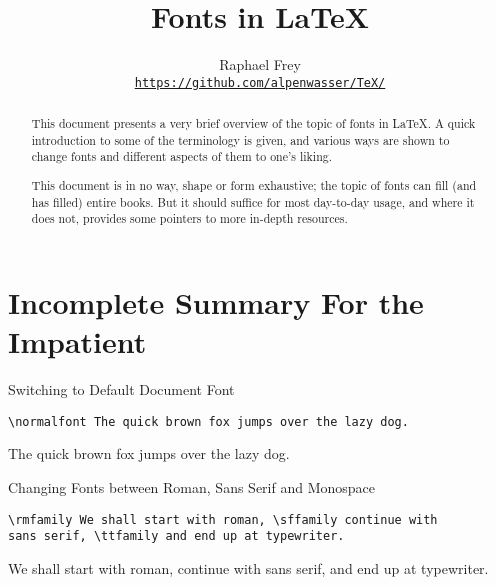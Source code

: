 \documentclass[a4paper,oneside,11pt]{article}
\title{Fonts in \LaTeX}
\author{Raphael Frey\\[2mm]%
    \small\href{https://github.com/alpenwasser/TeX/tree/master/fonts}
    {\nolinkurl{https://github.com/alpenwasser/TeX/}}}
\begin{document}

\maketitle

\vfill

\begin{abstract}
    This document  presents a  very brief  overview of the  topic of  fonts in
    \LaTeX. A  quick introduction  to some  of the  terminology is  given, and
    various ways  are shown to change  fonts and different aspects  of them to
    one's liking.

    This document is in  no way, shape or form exhaustive;  the topic of fonts
    can fill  (and has filled)  entire books. But  it should suffice  for most
    day-to-day usage,  and where it does  not, provides some pointers  to more
    in-depth resources.
\end{abstract}

\vfill

\tableofcontents

\vfill

\newpage
\section{Incomplete Summary For the Impatient}
\label{sec:summary}

\begin{titled-frame}
{\textsf{Switching to Default Document Font}}
\vspace{-1em}
\begin{verbatim}
\normalfont The quick brown fox jumps over the lazy dog.
\end{verbatim}
\normalfont The quick brown fox jumps over the lazy dog.
\end{titled-frame}

\vspace{-1.0em}

\begin{titled-frame}
{\textsf{Changing Fonts between Roman, Sans Serif and Monospace}}
\vspace{-1em}
\begin{verbatim}
\rmfamily We shall start with roman, \sffamily continue with
sans serif, \ttfamily and end up at typewriter.
\end{verbatim}
\rmfamily  We shall  start with  roman,  \sffamily continue  with sans  serif,
\ttfamily and end up at typewriter.
\end{titled-frame}
\end{document}
